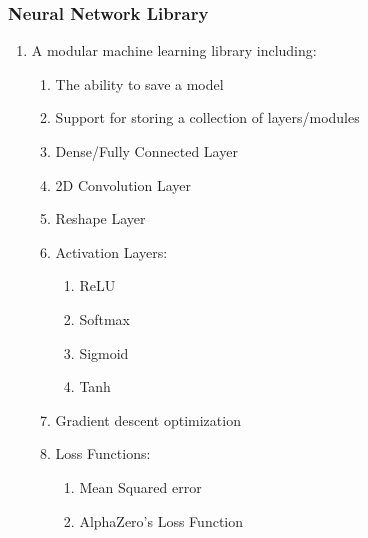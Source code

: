 \documentclass{article}
\begin{document}
    \subsubsection{Neural Network Library} 
    \begin{enumerate} 
        \item A modular machine learning library including:
        \begin{enumerate}
            \item The ability to save a model
            \item Support for storing a collection of layers/modules
            \item Dense/Fully Connected Layer
            \item 2D Convolution Layer
            \item Reshape Layer
            \item Activation Layers:
            \begin{enumerate}
                \item ReLU
                \item Softmax
                \item Sigmoid
                \item Tanh
            \end{enumerate} 
            \item Gradient descent optimization
            \item Loss Functions:
            \begin{enumerate}
                \item Mean Squared error
                \item AlphaZero's Loss Function
            \end{enumerate}
        \end{enumerate}
    \end{enumerate}
\end{document}

